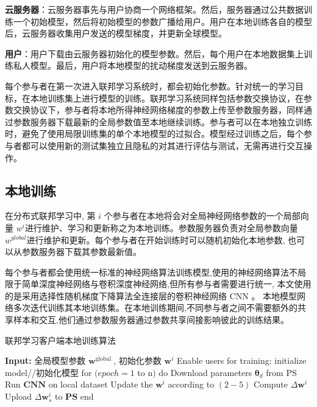 \textbf{云服务器}：云服务器事先与用户协商一个网络框架。然后，服务器通过公共数据训练一个初始模型，然后将初始模型的参数广播给用户。用户在本地训练各自的模型后，云服务器收集用户发送的模型梯度，并更新全球模型。

\textbf{用户}：用户下载由云服务器初始化的模型参数。然后，每个用户在本地数据集上训练私人模型。最后，用户将本地模型的扰动梯度发送到云服务器。

每个参与者在第一次进入联邦学习系统时，都会初始化参数。针对统一的学习目标，在本地训练集上进行模型的训练。联邦学习系统同样包括参数交换协议，在参数交换协议下，参与者将本地所得神经网络梯度的参数上传至参数服务器，同样通过参数服务器下载最新的全局参数值至本地继续训练。参与者可以在本地独立训练时，避免了使用局限训练集的单个本地模型的过拟合。模型经过训练之后，每个参与者都可以使用新的测试集独立且隐私的对其进行评估与测试，无需再进行交互操作。 

\subsection{本地训练}
在分布式联邦学习中, 第 $i$ 个参与者在本地将会对全局神经网络参数的一个局部向量 $w^{i}$进行维护、学习和更新称之为本地训练。参数服务器负责对全局参数向量 $w^{g l o b a l}$进行维护和更新。每个参与者在开始训练时可以随机初始化本地参数, 也可以从参数服务器下载其参数最新值。

每个参与者都会使用统一标准的神经网络算法训练模型,使用的神经网络算法不局限于简单深度神经网络与卷积深度神经网络,但所有参与者需要进行统一, 本文使用的是采用选择性随机梯度下降算法全连接层的卷积神经网络 $\mathrm{CNN}$ 。 本地模型网络多次迭代训练其本地训练集。在本地训练期间,不同参与者之间不需要额外的共享样本和交互,他们通过参数服务器通过参数共享间接影响彼此的训练结果。

\begin{algorithm}[!htb]
	\caption{联邦学习客户端本地训练算法}
	\label{FLLT algorithm}
	\begin{algorithmic}[1]
		\footnotesize
		\STATE \textbf{Input:} 全局模型参数 $\boldsymbol{w}^{\text {global }}$, 初始化参数 $\boldsymbol{w}^{i}$
	    \STATE Enable users for training: initialize model//初始化模型 
	    \STATE for $(e p o c h=1$ to $\mathrm{n})$ do
	    \STATE Download parameters $\boldsymbol{\theta}_{d}$ from PS
	    \STATE Run $\boldsymbol{CNN}$ on local dataset
	    \STATE Update the $\boldsymbol{w}^{i}$ according to $(2-5)$
	    \STATE Compute $\Delta \boldsymbol{w}^{i}$
		\STATE Upload $\Delta \boldsymbol{w}_{s}^{i}$ to $\mathbf{P S}$
		\STATE end
	\end{algorithmic}
\end{algorithm}

